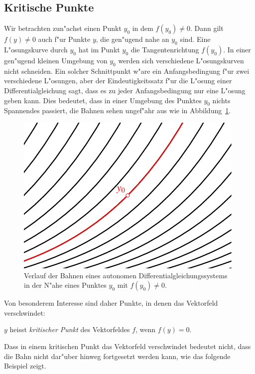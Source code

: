%
%
\subsection{Kritische Punkte}
Wir betrachten zun"achst einen Punkt $y_0$ in dem $f(y_0)\ne 0$.
Dann gilt $f(y)\ne 0$ auch f"ur Punkte $y$, die gen"ugend nahe an 
$y_0$ sind.
Eine L"osungskurve durch $y_0$ hat im Punkt $y_0$ die Tangentenrichtung
$f(y_0)$.
In einer gen"ugend kleinen Umgebung von $y_0$ werden sich verschiedene
L"osungskurven nicht schneiden.
Ein solcher Schnittpunkt w"are ein Anfangsbedingung f"ur zwei
verschiedene L"osungen, aber der Eindeutigkeitssatz f"ur die
L"osung einer Differentialgleichung sagt, dass es zu jeder 
Anfangsbedingung nur eine L"osung geben kann.
Dies bedeutet, dass in einer Umgebung des Punktes $y_0$ nichts
Spannendes passiert, die Bahnen sehen ungef"ahr aus wie in
Abbildung~\ref{geometrie:parallelebahnen}.
\begin{figure}
\centering
\includegraphics{chapters/images/geometrie-12.pdf}
\caption{Verlauf der Bahnen eines autonomen Differentialgleichungssystems
in der N"ahe eines Punktes $y_0$ mit $f(y_0)\ne 0$.
\label{geometrie:parallelebahnen}}
\end{figure}

Von besonderem Interesse sind daher Punkte, in denen das Vektorfeld
verschwindet:

\begin{definition}
$y$ heisst {\em kritischer Punkt} des Vektorfeldes $f$, wenn $f(y)=0$.
\end{definition}

Dass in einem kritischen Punkt das Vektorfeld verschwindet bedeutet nicht,
dass die Bahn nicht dar"uber hinweg fortgesetzt werden kann,
wie das folgende Beispiel zeigt.

